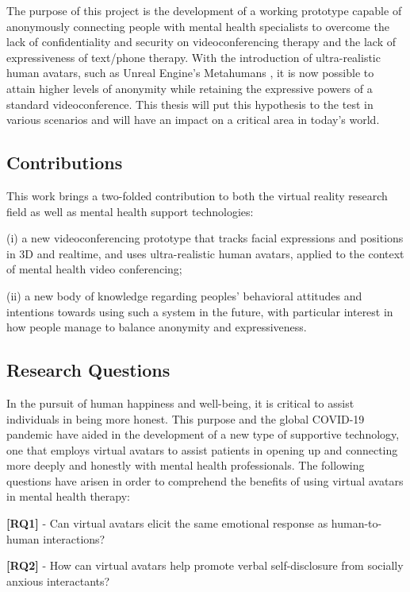 The purpose of this project is the development of a working prototype capable of anonymously connecting people with mental health specialists to overcome the lack of confidentiality and security on videoconferencing therapy and the lack of expressiveness of text/phone therapy. With the introduction of ultra-realistic human avatars, such as Unreal Engine's Metahumans \cite{EPI21, FAN21}, it is now possible to attain higher levels of anonymity while retaining the expressive powers of a standard videoconference. This thesis will put this hypothesis to the test in various scenarios and will have an impact on a critical area in today's world.

\subsection{Contributions}
This work brings a two-folded contribution to both the virtual reality research field as well as mental health support technologies:

(i) a new videoconferencing prototype that tracks facial expressions and positions in 3D and realtime, and uses ultra-realistic human avatars, applied to the context of mental health video conferencing;

(ii) a new body of knowledge regarding peoples’ behavioral attitudes and intentions towards using such a system in the future, with particular interest in how people manage to balance anonymity and expressiveness.

\subsection{Research Questions}
In the pursuit of human happiness and well-being, it is critical to assist individuals in being more honest. This purpose and the global COVID-19 pandemic have aided in the development of a new type of supportive technology, one that employs virtual avatars to assist patients in opening up and connecting more deeply and honestly with mental health professionals. The following questions have arisen in order to comprehend the benefits of using virtual avatars in mental health therapy:

\textbf{[RQ1]} - Can virtual avatars elicit the same emotional response as human-to-human interactions?

\textbf{[RQ2]} - How can virtual avatars help promote verbal self-disclosure from socially anxious interactants?



